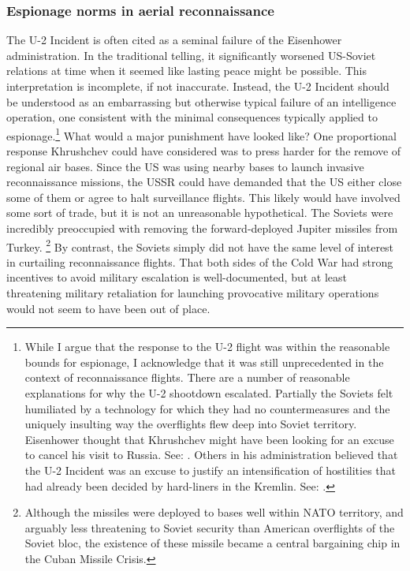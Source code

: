 \documentclass[14pt]{extarticle}
\begin{document}
\subsubsection{Espionage norms in aerial reconnaissance}
The U-2 Incident is often cited as a seminal failure of the Eisenhower administration. In the traditional telling, it significantly worsened US-Soviet relations at time when it seemed like lasting peace might be possible. This interpretation is incomplete, if not inaccurate. Instead, the U-2 Incident should be understood as an embarrassing but otherwise typical failure of an intelligence operation, one consistent with the minimal consequences typically applied to espionage.\footnote{While I argue that the response to the U-2 flight was within the reasonable bounds for espionage, I acknowledge that it was still unprecedented in the context of reconnaissance flights. There are a number of reasonable explanations for why the U-2 shootdown escalated. Partially the Soviets felt humiliated by a technology for which they had no countermeasures and the uniquely insulting way the overflights flew deep into Soviet territory. Eisenhower thought that Khrushchev might have been looking for an excuse to cancel his visit to Russia. See: \cite[p.~555]{eisenhower_waging_1965}. Others in his administration believed that the U-2 Incident was an excuse to justify an intensification of hostilities that had already been decided by hard-liners in the Kremlin. See: \cite[p.~328]{kistiakowsky_scientist_1976}.} What would a major punishment have looked like? One proportional response Khrushchev could have considered was to press harder for the remove of regional air bases. Since the US was using nearby bases to launch invasive reconnaissance missions, the USSR could have demanded that the US either close some of them or agree to halt surveillance flights. This likely would have involved some sort of trade, but it is not an unreasonable hypothetical. The Soviets were incredibly preoccupied with removing the forward-deployed Jupiter missiles from Turkey. \footnote{Although the missiles were deployed to bases well within NATO territory, and arguably less threatening to Soviet security than American overflights of the Soviet bloc, the existence of these missile became a central bargaining chip in the Cuban Missile Crisis.} By contrast, the Soviets simply did not have the same level of interest in curtailing reconnaissance flights. That both sides of the Cold War had strong incentives to avoid military escalation is well-documented, but at least threatening military retaliation for launching provocative military operations would not seem to have been out of place.
\end{document}
